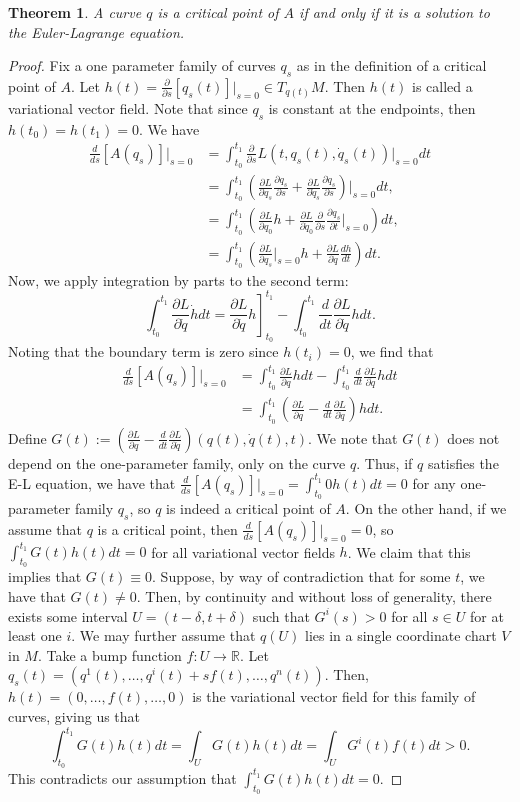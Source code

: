 \documentclass{article}
\newcommand{\R}{\mathbb R}
\newcommand{\de}{\delta}
\newcommand{\pd}[1]{\frac{\partial}{\partial #1}}
\newcommand{\pdof}[2]{\frac{\partial #1}{\partial #2}}
\newtheorem{thm}{Theorem}
\begin{document}
\begin{thm}
    A curve $q$ is a critical point of $A$ if and only if it is a solution to the Euler-Lagrange equation.
\end{thm}
\begin{proof}
    Fix a one parameter family of curves $q_s$ as in the definition of a critical point of $A$. Let $h(t) = \pd{s}[q_s(t)]\big|_{s=0}\in T_{q(t)}M$. Then $h(t)$ is called a variational vector field. Note that since $q_s$ is constant at the endpoints, then $h(t_0)=h(t_1) = 0$. We have
    \begin{align*}
        \frac{d}{ds}[A(q_s)]\Big|_{s=0} &= \int_{t_0}^{t_1}\pd{s}L(t,q_s(t),\dot q_s(t))\big|_{s=0}dt\\
        &=\int_{t_0}^{t_1}\left(\pdof{L}{q_s}\pdof{q_s}{s}+\pdof{L}{\dot q_s}\pdof{\dot q_s}{s}\right)\bigg|_{s=0}dt,\\
        &=\int_{t_0}^{t_1}\left(\pdof{L}{q_0}h+\pdof{L}{\dot q_0}\pd{s}\pdof{q_s}{t}\bigg|_{s=0}\right)dt,\\
        &=\int_{t_0}^{t_1}\left(\pdof{L}{q_s}\bigg|_{s=0}h+\pdof{L}{\dot q}\frac{dh}{dt}\right)dt.
    \end{align*}
    Now, we apply integration by parts to the second term:
    \[\int_{t_0}^{t_1}\pdof{L}{\dot q}\dot h dt = \left.\pdof{L}{\dot q}h\right]_{t_0}^{t_1}-\int_{t_0}^{t_1}\frac{d}{dt}\pdof{L}{\dot q}h dt.\]
    Noting that the boundary term is zero since $h(t_i) = 0$, we find that
    \begin{align*}
        \frac{d}{ds}[A(q_s)]\Big|_{s=0}&=\int_{t_0}^{t_1}\pdof{L}{q}hdt-\int_{t_0}^{t_1}\frac{d}{dt}\pdof{L}{\dot q}h dt\\
        &=\int_{t_0}^{t_1}\left(\pdof{L}{q}-\frac{d}{dt}\pdof{L}{\dot q}\right)h dt.
    \end{align*}
    Define $G(t) := \left(\pdof{L}{q}-\frac{d}{dt}\pdof{L}{\dot q}\right)(q(t),\dot q(t),t)$. We note that $G(t)$ does not depend on the one-parameter family, only on the curve $q$. Thus, if $q$ satisfies the E-L equation, we have that $\frac{d}{ds}[A(q_s)]\Big|_{s=0} = \int_{t_0}^{t_1}0h(t)dt = 0$ for any one-parameter family $q_s$, so $q$ is indeed a critical point of $A$. On the other hand, if we assume that $q$ is a critical point, then $\frac{d}{ds}[A(q_s)]\Big|_{s=0}=0$, so $\int_{t_0}^{t_1}G(t)h(t) dt = 0$ for all variational vector fields $h$. We claim that this implies that $G(t)\equiv 0$. Suppose, by way of contradiction that for some $t$, we have that $G(t)\neq 0$. Then, by continuity and without loss of generality, there exists some interval $U=(t-\de,t+\de)$ such that $G^i(s)>0$ for all $s\in U$ for at least one $i$. We may further assume that $q(U)$ lies in a single coordinate chart $V$ in $M$. Take a bump function $f:U\to\R$. Let $q_s(t) = (q^1(t),\dots, q^i(t) + sf(t),\dots,q^n(t))$. Then, $h(t) = (0,\dots,f(t),\dots,0)$ is the variational vector field for this family of curves, giving us that
    \[\int_{t_0}^{t_1} G(t)h(t)dt = \int_UG(t)h(t) dt  = \int_UG^i(t)f(t) dt>0.\]
    This contradicts our assumption that $\int_{t_0}^{t_1} G(t)h(t)dt = 0$.
\end{proof}
\end{document}
